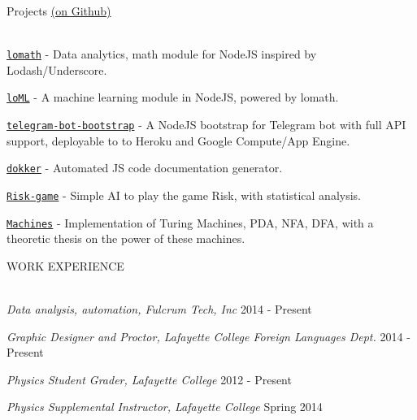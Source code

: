 \documentclass{resume} %
\begin{document}

\begin{rSection}{Projects \href{https://github.com/kengz}{(on Github)}}

{\setlength{\parskip}{1.8pt}

\ \\
{\tt \href{https://github.com/kengz/lomath}{lomath}} - Data analytics, math module for NodeJS inspired by Lodash/Underscore.

{\tt \href{https://github.com/kengz/loML}{loML}} - A machine learning module in NodeJS, powered by lomath. 

{\tt \href{https://github.com/kengz/telegram-bot-bootstrap}{telegram-bot-bootstrap}} - A NodeJS bootstrap for Telegram bot with full API support, deployable to to Heroku and Google Compute/App Engine.

{\tt \href{https://github.com/kengz/dokker}{dokker}} - Automated JS code documentation generator.

{\tt \href{https://github.com/kengz/Risk-game}{Risk-game}} - Simple AI to play the game Risk, with statistical analysis.

{\tt \href{https://github.com/kengz/Machines}{Machines}} - Implementation of Turing Machines, PDA, NFA, DFA, with a theoretic thesis on the power of these machines.
}
\end{rSection}



\begin{rSection}{WORK EXPERIENCE}

{\setlength{\parskip}{1.8pt}
\ \\
{\sl Data analysis, automation, Fulcrum Tech, Inc} \hfill  2014 - Present

{\sl Graphic Designer and Proctor, Lafayette College Foreign Languages Dept.} \hfill  2014 - Present

{\sl Physics Student Grader, Lafayette College} \hfill  2012 - Present

{\sl Physics Supplemental Instructor, Lafayette College} \hfill  Spring 2014

}
\end{rSection}
\end{document}
